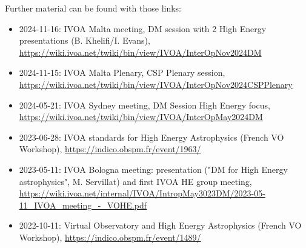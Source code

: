 \documentclass[11pt,a4paper]{ivoa}
\begin{document}
Further material can be found with those links:
\begin{itemize}
    \item 2024-11-16: IVOA Malta meeting, DM session with 2 High Energy presentations (B. Khelifi/I. Evans), \url{https://wiki.ivoa.net/twiki/bin/view/IVOA/InterOpNov2024DM}
    \item 2024-11-15: IVOA Malta Plenary, CSP Plenary session, \url{https://wiki.ivoa.net/twiki/bin/view/IVOA/InterOpNov2024CSPPlenary}
    \item 2024-05-21: IVOA Sydney meeting, DM Session High Energy focus, \url{https://wiki.ivoa.net/twiki/bin/view/IVOA/InterOpMay2024DM}
    \item 2023-06-28: IVOA standards for High Energy Astrophysics (French VO Workshop), \url{https://indico.obspm.fr/event/1963/}
    \item 2023-05-11: IVOA Bologna meeting: presentation ("DM for High Energy astrophysics", M. Servillat) and first IVOA HE group meeting, \url{https://wiki.ivoa.net/internal/IVOA/IntropMay3023DM/2023-05-11_IVOA_meeting_-_VOHE.pdf}
    \item 2022-10-11: Virtual Observatory and High Energy Astrophysics (French VO Workshop), \url{https://indico.obspm.fr/event/1489/}
\end{itemize}

\end{document}
